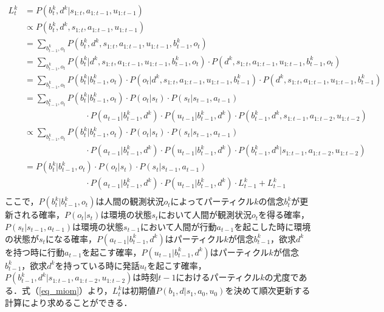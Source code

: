 \begin{equation}
  \begin{split}
  \label{eq_miom}
  L^k_t&=P(b_t^k,d^k|s_{1:t},a_{1:t-1},u_{1:t-1})\\
  &\propto P(b_t^k,d^k,s_{1:t},a_{1:t-1},u_{1:t-1})\\
  &= \sum_{b_{t-1}^k,o_t}P(b_t^k,d^k,s_{1:t},a_{1:t-1},u_{1:t-1},b_{t-1}^k,o_t)\\
  &= \sum_{b_{t-1}^k,o_t}P(b_t^k|d^k,s_{1:t},a_{1:t-1},u_{1:t-1},b_{t-1}^k,o_t)\cdot P(d^k,s_{1:t},a_{1:t-1},u_{1:t-1},b_{t-1}^k,o_t)\\
  &= \sum_{b_{t-1}^k,o_t}P(b_t^k|b_{t-1}^k,o_t)\cdot P(o_t|d^k,s_{1:t},a_{1:t-1},u_{1:t-1},b_{t-1}^k)\cdot P(d^k,s_{1:t},a_{1:t-1},u_{1:t-1},b_{t-1}^k)\\
  &= \sum_{b_{t-1}^k,o_t}P(b_t^k|b_{t-1}^k,o_t)\cdot P(o_t|s_t)\cdot P(s_t|s_{t-1},a_{t-1})\\
  &\hspace{3cm} \cdot P(a_{t-1}|b_{t-1}^k,d^k)\cdot P(u_{t-1}|b_{t-1}^k,d^k)\cdot P(b_{t-1}^k,d^k,s_{1:t-1},a_{1:t-2},u_{1:t-2})\\
  &\propto \sum_{b_{t-1}^k,o_t}P(b_t^k|b_{t-1}^k,o_t)\cdot P(o_t|s_t)\cdot P(s_t|s_{t-1},a_{t-1})\\
  &\hspace{3cm} \cdot P(a_{t-1}|b_{t-1}^k,d^k)\cdot P(u_{t-1}|b_{t-1}^k,d^k)\cdot P(b_{t-1}^k,d^k|s_{1:t-1},a_{1:t-2},u_{1:t-2})\\
  &= P(b_t^k|b_{t-1}^k,o_t)\cdot P(o_t|s_t)\cdot P(s_t|s_{t-1},a_{t-1})\\
  &\hspace{3cm} \cdot P(a_{t-1}|b_{t-1}^k,d^k)\cdot P(u_{t-1}|b_{t-1}^k,d^k)\cdot L^k_{t-1}+L^k_{t-1}\\
  \end{split}
\end{equation}
ここで，$P(b_t^k|b_{t-1}^k,o_t)$は人間の観測状況$o_t$によってパーティクル$k$の信念$b_t^k$が更新される確率，$P(o_t|s_t)$は環境の状態$s_t$において人間が観測状況$o_t$を得る確率，$P(s_t|s_{t-1},a_{t-1})$は環境の状態$s_{t-1}$において人間が行動$a_{t-1}$を起こした時に環境の状態が$s_{t}$になる確率，$P(a_{t-1}|b_{t-1}^k,d^k)$はパーティクル$k$が信念$b_{t-1}^k$，欲求$d^k$を持つ時に行動$a_{t-1}$を起こす確率，$P(u_{t-1}|b_{t-1}^k,d^k)$はパーティクル$k$が信念$b_{t-1}^k$，欲求$d^k$を持っている時に発話$u_t$を起こす確率，$P(b_{t-1}^k,d^k|s_{1:t-1},a_{1:t-2},u_{1:t-2})$は時刻$t-1$におけるパーティクル$k$の尤度である．式（\ref{eq_miom}）より，$L^k_t$は初期値$P(b_1,d|s_1,a_0,u_0)$を決めて順次更新する計算により求めることができる．

